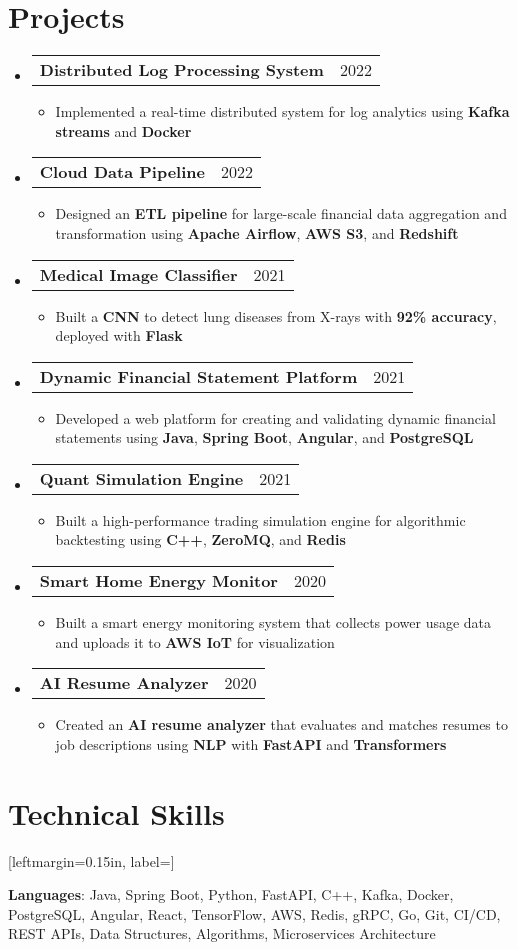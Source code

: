 \documentclass[letterpaper,11pt]{article}
\makeatletter
\newcommand{\resumeItem}[1]{
    \item\small{
            {#1 \vspace{-2pt}}
    }
}
\newcommand{\resumeProjectHeading}[2]{
    \item
    \begin{tabular*}{0.97\textwidth}{l@{\extracolsep{\fill}}r}
    \small#1 & #2 \\
    \end{tabular*}\vspace{-7pt}
}
\newcommand{\resumeSubHeadingListStart}{\begin{itemize}[leftmargin=0.15in, label={}]}
\newcommand{\resumeSubHeadingListEnd}{\end{itemize}}
\newcommand{\resumeItemListStart}{\begin{itemize}}
\newcommand{\resumeItemListEnd}{\end{itemize}\vspace{-5pt}}
\makeatother
\begin{document}
\section{Projects}
\resumeSubHeadingListStart
\resumeProjectHeading
{\textbf{Distributed Log Processing System}}{2022}
\resumeItemListStart
\resumeItem{Implemented a real-time distributed system for log analytics using \textbf{Kafka streams} and \textbf{Docker}}
\resumeItemListEnd
\resumeProjectHeading
{\textbf{Cloud Data Pipeline}}{2022}
\resumeItemListStart
\resumeItem{Designed an \textbf{ETL pipeline} for large-scale financial data aggregation and transformation using \textbf{Apache Airflow}, \textbf{AWS S3}, and \textbf{Redshift}}
\resumeItemListEnd
\resumeProjectHeading
{\textbf{Medical Image Classifier}}{2021}
\resumeItemListStart
\resumeItem{Built a \textbf{CNN} to detect lung diseases from X-rays with \textbf{92\% accuracy}, deployed with \textbf{Flask}}
\resumeItemListEnd
\resumeProjectHeading
{\textbf{Dynamic Financial Statement Platform}}{2021}
\resumeItemListStart
\resumeItem{Developed a web platform for creating and validating dynamic financial statements using \textbf{Java}, \textbf{Spring Boot}, \textbf{Angular}, and \textbf{PostgreSQL}}
\resumeItemListEnd
\resumeProjectHeading
{\textbf{Quant Simulation Engine}}{2021}
\resumeItemListStart
\resumeItem{Built a high-performance trading simulation engine for algorithmic backtesting using \textbf{C++}, \textbf{ZeroMQ}, and \textbf{Redis}}
\resumeItemListEnd
\resumeProjectHeading
{\textbf{Smart Home Energy Monitor}}{2020}
\resumeItemListStart
\resumeItem{Built a smart energy monitoring system that collects power usage data and uploads it to \textbf{AWS IoT} for visualization}
\resumeItemListEnd
\resumeProjectHeading
{\textbf{AI Resume Analyzer}}{2020}
\resumeItemListStart
\resumeItem{Created an \textbf{AI resume analyzer} that evaluates and matches resumes to job descriptions using \textbf{NLP} with \textbf{FastAPI} and \textbf{Transformers}}
\resumeItemListEnd
\resumeSubHeadingListEnd

\section{Technical Skills}
\begin{itemize}[leftmargin=0.15in, label={]}
\small{\item{
\textbf{Languages}{: Java, Spring Boot, Python, FastAPI, C++, Kafka, Docker, PostgreSQL, Angular, React, TensorFlow, AWS, Redis, gRPC, Go, Git, CI/CD, REST APIs, Data Structures, Algorithms, Microservices Architecture} \\
}}
\end{itemize}
\end{document}
